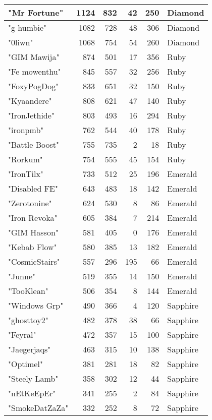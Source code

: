 \documentclass{article}
\begin{document}
\begin{table}[htbp]
\begin{tabular}{|l|r|r|r|r|l|}
"Mr Fortune" & 1124 & 832 & 42 & 250 & Diamond \\ \hline
"g humbie" & 1082 & 728 & 48 & 306 & Diamond \\ \hline
"0liwn" & 1068 & 754 & 54 & 260 & Diamond \\ \hline
"GIM Mawija" & 874 & 501 & 17 & 356 & Ruby \\ \hline
"Fe mowenthu" & 845 & 557 & 32 & 256 & Ruby \\ \hline
"FoxyPogDog" & 833 & 651 & 32 & 150 & Ruby \\ \hline
"Kyaandere" & 808 & 621 & 47 & 140 & Ruby \\ \hline
"IronJethide" & 803 & 493 & 16 & 294 & Ruby \\ \hline
"ironpmb" & 762 & 544 & 40 & 178 & Ruby \\ \hline
"Battle Boost" & 755 & 735 & 2 & 18 & Ruby \\ \hline
"Rorkum" & 754 & 555 & 45 & 154 & Ruby \\ \hline
"IronTilx" & 733 & 512 & 25 & 196 & Emerald \\ \hline
"Disabled FE" & 643 & 483 & 18 & 142 & Emerald \\ \hline
"Zerotonine" & 624 & 530 & 8 & 86 & Emerald \\ \hline
"Iron Revoka" & 605 & 384 & 7 & 214 & Emerald \\ \hline
"GIM Hasson" & 581 & 405 & 0 & 176 & Emerald \\ \hline
"Kebab Flow" & 580 & 385 & 13 & 182 & Emerald \\ \hline
"CosmicStairs" & 557 & 296 & 195 & 66 & Emerald \\ \hline
"Junne" & 519 & 355 & 14 & 150 & Emerald \\ \hline
"TooKlean" & 506 & 354 & 8 & 144 & Emerald \\ \hline
"Windows Grp" & 490 & 366 & 4 & 120 & Sapphire \\ \hline
"ghosttoy2" & 482 & 378 & 38 & 66 & Sapphire \\ \hline
"Feyral" & 472 & 357 & 15 & 100 & Sapphire \\ \hline
"Jaegerjaqs" & 463 & 315 & 10 & 138 & Sapphire \\ \hline
"Optimel" & 381 & 281 & 18 & 82 & Sapphire \\ \hline
"Steely Lamb" & 358 & 302 & 12 & 44 & Sapphire \\ \hline
"nEtKeEpEr" & 341 & 255 & 2 & 84 & Sapphire \\ \hline
"SmokeDatZaZa" & 332 & 252 & 8 & 72 & Sapphire \\ \hline

\end{tabular}
\end{table}
\end{document}
